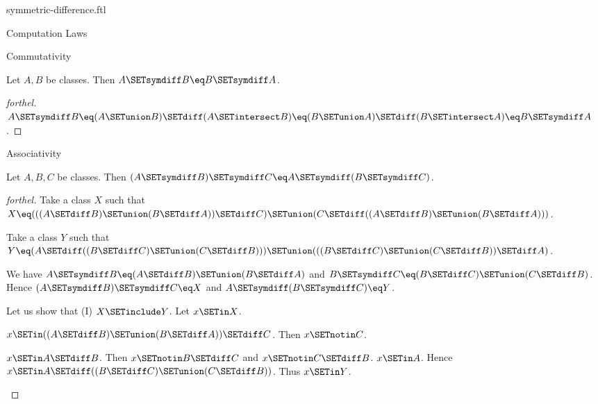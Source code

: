 \documentclass{naproche-library}
\begin{document}
\begin{smodule}[title=Symmetric Difference]{symmetric-difference.ftl}
\begin{sfragment}{Computation Laws}
  \begin{sfragment}{Commutativity}
    \begin{proposition}[forthel,id=FOUNDATIONS_03_4518372049944576]
      Let $A, B$ be classes.
      Then $A \SETsymdiff B \eq B \SETsymdiff A$.
    \end{proposition}
    \begin{proof}[forthel]
      $A \SETsymdiff B
        \eq (A \SETunion B) \SETdiff (A \SETintersect B)
        \eq (B \SETunion A) \SETdiff (B \SETintersect A)
        \eq B \SETsymdiff A$.
    \end{proof}
  \end{sfragment}

  \begin{sfragment}{Associativity}
    \begin{proposition}[forthel,id=FOUNDATIONS_03_8680845204258816]
      Let $A, B, C$ be classes.
      Then $(A \SETsymdiff B) \SETsymdiff C \eq A \SETsymdiff (B \SETsymdiff C)$.
    \end{proposition}
    \begin{proof}[forthel]
      Take a class $X$ such that $X \eq (((A \SETdiff B) \SETunion (B \SETdiff A)) \SETdiff C) \SETunion (C \SETdiff ((A \SETdiff B) \SETunion (B \SETdiff A)))$.

      Take a class $Y$ such that $Y \eq (A \SETdiff ((B \SETdiff C) \SETunion (C \SETdiff B))) \SETunion (((B \SETdiff C) \SETunion (C \SETdiff B)) \SETdiff A)$.

      We have $A \SETsymdiff B \eq (A \SETdiff B) \SETunion (B \SETdiff A)$ and $B \SETsymdiff C \eq (B \SETdiff C) \SETunion (C \SETdiff B)$.
      Hence $(A \SETsymdiff B) \SETsymdiff C \eq X$ and $A \SETsymdiff (B \SETsymdiff C) \eq Y$.

      Let us show that (I) $X \SETinclude Y$.
        Let $x \SETin X$.

        \begin{case}{$x \SETin ((A \SETdiff B) \SETunion (B \SETdiff A)) \SETdiff C$.}
          Then $x \SETnotin C$.

          \begin{case}{$x \SETin A \SETdiff B$.}
            Then $x \SETnotin B \SETdiff C$ and $x \SETnotin C \SETdiff B$. $x \SETin A$.
            Hence $x \SETin A \SETdiff ((B \SETdiff C) \SETunion (C \SETdiff B))$.
            Thus $x \SETin Y$.
          \end{case}


\end{case}
\end{proof}
\end{sfragment}
\end{sfragment}
\end{smodule}
\end{document}
